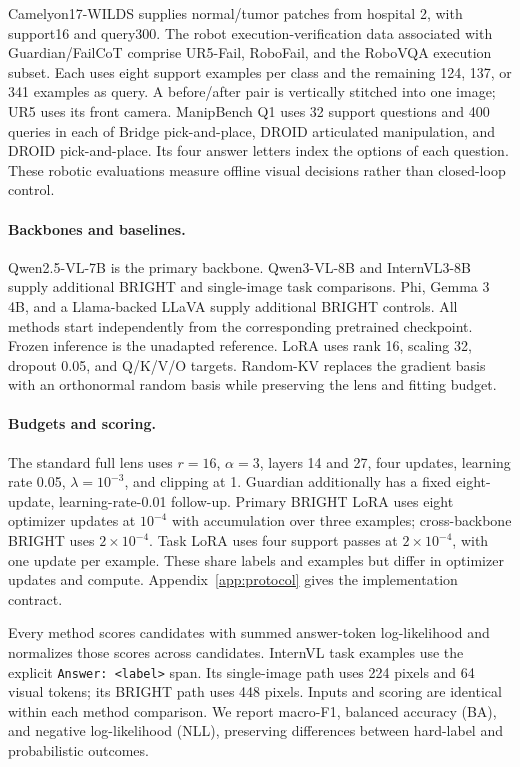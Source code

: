 \documentclass{article}
\begin{document}
Camelyon17-WILDS \citep{koh2021wilds} supplies normal/tumor patches from hospital 2, with support16 and query300. The robot execution-verification data associated with Guardian/FailCoT \citep{pacaud2026guardian} comprise UR5-Fail, RoboFail, and the RoboVQA execution subset. Each uses eight support examples per class and the remaining 124, 137, or 341 examples as query. A before/after pair is vertically stitched into one image; UR5 uses its front camera. ManipBench Q1 \citep{zhao2025manipbench} uses 32 support questions and 400 queries in each of Bridge pick-and-place, DROID articulated manipulation, and DROID pick-and-place. Its four answer letters index the options of each question. These robotic evaluations measure offline visual decisions rather than closed-loop control.

\paragraph{Backbones and baselines.}
Qwen2.5-VL-7B \citep{bai2025qwen25vl} is the primary backbone. Qwen3-VL-8B and InternVL3-8B \citep{bai2025qwen3vl,zhu2025internvl3} supply additional BRIGHT and single-image task comparisons. Phi, Gemma 3 4B, and a Llama-backed LLaVA supply additional BRIGHT controls. All methods start independently from the corresponding pretrained checkpoint. Frozen inference is the unadapted reference. LoRA uses rank 16, scaling 32, dropout 0.05, and Q/K/V/O targets. Random-KV replaces the gradient basis with an orthonormal random basis while preserving the lens and fitting budget.

\paragraph{Budgets and scoring.}
The standard full lens uses $r=16$, $\alpha=3$, layers 14 and 27, four updates, learning rate 0.05, $\lambda=10^{-3}$, and clipping at 1. Guardian additionally has a fixed eight-update, learning-rate-0.01 follow-up. Primary BRIGHT LoRA uses eight optimizer updates at $10^{-4}$ with accumulation over three examples; cross-backbone BRIGHT uses $2\times10^{-4}$. Task LoRA uses four support passes at $2\times10^{-4}$, with one update per example. These share labels and examples but differ in optimizer updates and compute. Appendix~\ref{app:protocol} gives the implementation contract.

Every method scores candidates with summed answer-token log-likelihood and normalizes those scores across candidates. InternVL task examples use the explicit \texttt{Answer: <label>} span. Its single-image path uses 224 pixels and 64 visual tokens; its BRIGHT path uses 448 pixels. Inputs and scoring are identical within each method comparison. We report macro-F1, balanced accuracy (BA), and negative log-likelihood (NLL), preserving differences between hard-label and probabilistic outcomes.
\end{document}

